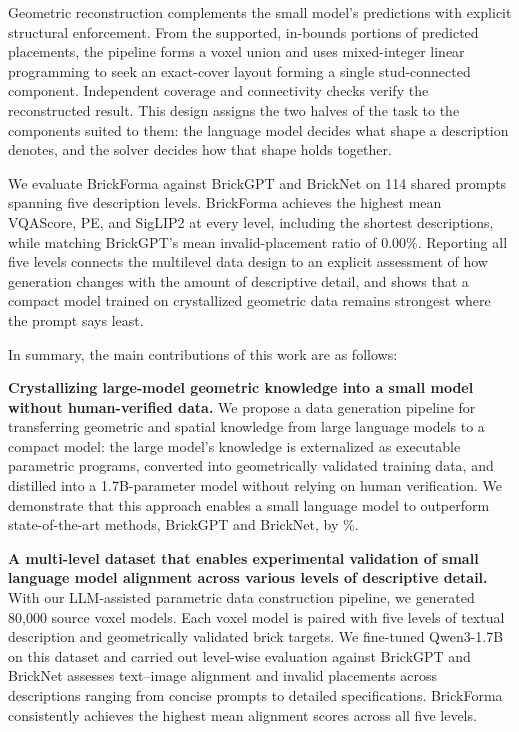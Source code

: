 Geometric reconstruction complements the small model's predictions with explicit structural enforcement. From the supported, in-bounds portions of predicted placements, the pipeline forms a voxel union and uses mixed-integer linear programming to seek an exact-cover layout forming a single stud-connected component. Independent coverage and connectivity checks verify the reconstructed result. This design assigns the two halves of the task to the components suited to them: the language model decides what shape a description denotes, and the solver decides how that shape holds together.

We evaluate BrickForma against BrickGPT and BrickNet on 114 shared prompts spanning five description levels. BrickForma achieves the highest mean VQAScore, PE, and SigLIP2 at every level, including the shortest descriptions, while matching BrickGPT's mean invalid-placement ratio of 0.00\%. Reporting all five levels connects the multilevel data design to an explicit assessment of how generation changes with the amount of descriptive detail, and shows that a compact model trained on crystallized geometric data remains strongest where the prompt says least.

In summary, the main contributions of this work are as follows:

\textbf{Crystallizing large-model geometric knowledge into a small model 
without human-verified data.}
We propose a data generation pipeline for transferring geometric and 
spatial knowledge from large language models to a compact model: the 
large model's knowledge is externalized as executable parametric programs, 
converted into geometrically validated training data, and distilled into 
a 1.7B-parameter model without relying on human verification. 
We demonstrate that this approach enables a small language model to 
outperform state-of-the-art methods, BrickGPT and BrickNet, by \%.



\textbf{A multi-level dataset that enables experimental validation of small language model alignment across 
various levels of descriptive detail.}
With our LLM-assisted parametric data construction pipeline, we generated 80,000 
source voxel models. Each voxel model is paired with five levels of textual description 
and geometrically validated brick targets. We fine-tuned Qwen3-1.7B on this dataset and carried out level-wise evaluation 
against BrickGPT and BrickNet assesses text--image alignment and invalid 
placements across descriptions ranging from concise prompts to detailed 
specifications. BrickForma consistently achieves the highest mean 
alignment scores across all five levels.